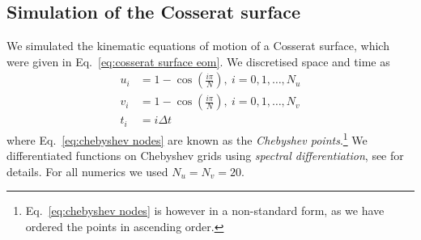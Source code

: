 \documentclass[withindex,glossary,techreport]{cam-thesis}
\begin{document}
\begin{appendices}

\section{Simulation of the Cosserat surface}

We simulated the kinematic equations of motion of a Cosserat surface, which were given in Eq.~\ref{eq:cosserat surface eom}. We discretised space and time as
\begin{subequations}
	\begin{align} 
		u_i & = 1 - \cos \left( \frac{i \pi}{N} \right),\ i = 0, 1, \dots, N_u \label{eq:chebyshev nodes} \\
		v_i & = 1 - \cos \left( \frac{i \pi}{N} \right),\ i = 0, 1, \dots, N_v  \\
		t_i & = i \Delta t
	\end{align}
\end{subequations}
where Eq.~\ref{eq:chebyshev nodes} are known as the \textit{Chebyshev points}.\footnote{Eq.~\ref{eq:chebyshev nodes} is however in a non-standard form, as we have ordered the points in ascending order.} We differentiated functions on Chebyshev grids using \textit{spectral differentiation}, see \citep{trefethen2000spectral} for details. For all numerics we used $N_u = N_v = 20$.


\end{appendices}
\end{document}
